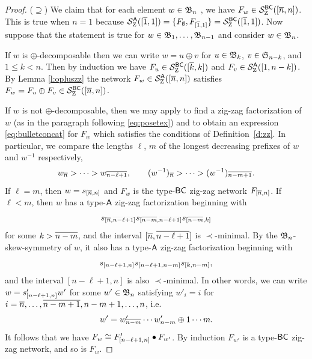 \documentclass[11pt]{article}
\theoremstyle{definition}
\numberwithin{equation}{section}
\begin{document}
\begin{proof}
  ($\supseteq$)
  We claim that for each element $w \in \mathfrak{B}_n$ \avoidingp,
  we have $F_w \in \mathcal S^{\mathsf{BC}}_{\mathrm Z}([\overline{n}, n])$.
  This is true when $n = 1$ because
  $\mathcal S^{\mathsf{A}}_{\mathrm Z}([\overline{1},1]) = \{ F_\emptyset, F_{[\overline{1},1]} \} = \mathcal S^{\mathsf{BC}}_{\mathrm Z}([\overline{1},1])$.
  Now suppose that the
  statement is true
  for $w \in \mathfrak{B}_{1},\dotsc,\mathfrak{B}_{n-1}$ and consider $w \in \mathfrak{B}_n$.

  If $w$ is $\oplus$-decomposable then we can write
  $w = u \oplus v$ for $u \in \mathfrak{B}_{k}$, $v \in \mathfrak{S}_{n-k}$, and
  $1 \leq k < n$.
  Then by induction we have $F_u \in \mathcal S^{\mathsf{BC}}_{\mathrm Z}([\overline{k},k])$ and
  $F_v \in \mathcal S^{\mathsf{A}}_{\mathrm Z}([1,n-k])$.
By Lemma \ref{l:opluszz} the network $F_w \in \mathcal S^{\mathsf{A}}_{\mathrm Z}([\overline{n},n])$
satisfies
$F_w = F_u \oplus F_v \in \mathcal S^{\mathsf{BC}}_{\mathrm Z}([\overline{n},n])$.

If
$w$ is not $\oplus$-decomposable,
then we may apply \cite[Obs.\,3.3]{SkanNNDCB} to find a zig-zag factorization
of $w$ (as in the paragraph following \eqref{eq:posetex})
and to obtain an expression \eqref{eq:bulletconcat}
for $F_w$ which satisfies the conditions of Definition~\ref{d:zz}.
In particular, we compare the lengths $\ell$, $m$
of the longest decreasing prefixes of $w$ and $w^{-1}$ respectively,
\begin{equation*}
  w_{\smash{\overline{n}}} > \cdots > w_{\smash{\overline{n-\ell+1}}},
  \qquad (w^{-1})_{\smash{\overline{n}}} > \cdots > (w^{-1})_{\smash{\overline{n-m+1}}}.
\end{equation*}
If $\ell = m$, then $w = s_{\smash{[\overline{n}, n]}}$ and $F_w$ is the type-$\mathsf{BC}$
zig-zag network $F_{\smash{[\overline{n},n]}}$.
If $\ell < m$, then $w$ has a type-$\mathsf{A}$ zig-zag factorization beginning
with
\begin{equation*}
  s_{\smash{[\overline{n}, \overline{n-\ell+1}]}}s_{\smash{[\overline{n-m},\overline{n-\ell+1}]}}s_{\smash{[\overline{n-m},k]}}
\end{equation*}
for some $k > \overline{n-m}$,
and the interval $[\overline{n}, \overline{n-\ell+1}]$ is $\prec$-minimal.
By the $\mathfrak{B}_n$-skew-symmetry of $w$,
it also has a type-$\mathsf{A}$ zig-zag factorization beginning with
\begin{equation*}
  s_{[n-\ell+1,n]}s_{[n-\ell+1,n-m]}s_{\smash{[\overline{k},n-m]}},
\end{equation*}
and the interval $[n-\ell+1,n]$ is also $\prec$-minimal.
In other words, we can write $w = s'_{\smash{[n-\ell+1,n]}}w'$
for some $w' \in \mathfrak{B}_n$ satisfying
$w'_i = i$ for $i = \overline{n}, \dotsc, \overline{n-m+1}, n-m+1,\dotsc,n$, i.e. \begin{equation*}
  w' = %
  w'_{\smash{\ol{n-m}}} \cdots w'_{n-m} \oplus 1 \cdots m.
\end{equation*}
It follows that we have $F_w \cong F'_{\smash{[n-\ell+1,n]}} \bullet F_{w'}$.
By induction $F_{w'}$ is a type-$\mathsf{BC}$ zig-zag network, and so is $F_w$.
\end{proof}
\end{document}

